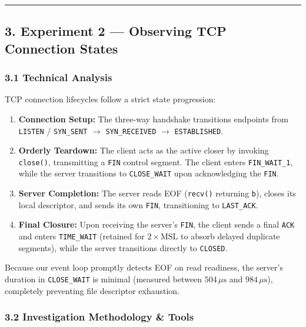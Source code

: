 \documentclass[
]{article}
\providecommand{\tightlist}{%
  \setlength{\itemsep}{0pt}\setlength{\parskip}{0pt}}
\begin{document}
\begin{center}\rule{0.5\linewidth}{0.5pt}\end{center}

\hypertarget{experiment-2-observing-tcp-connection-states}{%
\subsection{3. Experiment 2 --- Observing TCP Connection
States}\label{experiment-2-observing-tcp-connection-states}}

\hypertarget{technical-analysis-1}{%
\subsubsection{3.1 Technical Analysis}\label{technical-analysis-1}}

TCP connection lifecycles follow a strict state progression:

\begin{enumerate}
\def\labelenumi{\arabic{enumi}.}
\tightlist
\item
  \textbf{Connection Setup:} The three-way handshake transitions
  endpoints from \texttt{LISTEN} / \texttt{SYN\_SENT} \(\to\)
  \texttt{SYN\_RECEIVED} \(\to\) \texttt{ESTABLISHED}.
\item
  \textbf{Orderly Teardown:} The client acts as the active closer by
  invoking \texttt{close()}, transmitting a \texttt{FIN} control
  segment. The client enters \texttt{FIN\_WAIT\_1}, while the server
  transitions to \texttt{CLOSE\_WAIT} upon acknowledging the
  \texttt{FIN}.
\item
  \textbf{Server Completion:} The server reads EOF (\texttt{recv()}
  returning \texttt{b\textquotesingle{}\textquotesingle{}}), closes its
  local descriptor, and sends its own \texttt{FIN}, transitioning to
  \texttt{LAST\_ACK}.
\item
  \textbf{Final Closure:} Upon receiving the server's \texttt{FIN}, the
  client sends a final \texttt{ACK} and enters \texttt{TIME\_WAIT}
  (retained for \(2\times\text{MSL}\) to absorb delayed duplicate
  segments), while the server transitions directly to \texttt{CLOSED}.
\end{enumerate}

Because our event loop promptly detects EOF on read readiness, the
server's duration in \texttt{CLOSE\_WAIT} is minimal (measured between
\(504\,\mu\text{s}\) and \(984\,\mu\text{s}\)), completely preventing
file descriptor exhaustion.

\hypertarget{investigation-methodology-tools-1}{%
\subsubsection{3.2 Investigation Methodology \&
Tools}\label{investigation-methodology-tools-1}}
\end{document}
